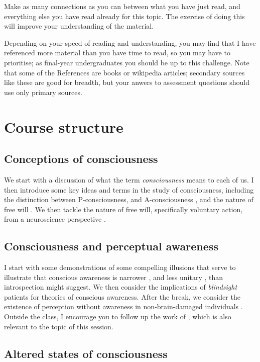 \documentclass[11pt]{article}
\begin{document}
Make as many connections as you can between what you have just read, and
everything else you have read already for this topic. The exercise of doing
this will improve your understanding of the material.

Depending on your speed of reading and understanding, you may find that I have
referenced more material than you have time to read, so you may have to
prioritise; as final-year undergraduates you should be up to this
challenge. Note that some of the References are books or wikipedia articles;
secondary sources like these are good for breadth, but your anwers to
assessment questions should use only primary sources.

\section*{Course structure}

\subsection*{Conceptions of consciousness}

We start with a discussion of what the term \emph{consciousness} means
to each of us. I then introduce some key ideas and terms in the study
of consciousness, including the distinction between P-consciousness,
and A-consciousness \cite{block95}, and the nature of free will
\cite{freewill}.  We then tackle the nature of free will, specifically
voluntary action, from a neuroscience perspective
\cite{lau04,libet83,haggard05}.

\subsection*{Consciousness and perceptual awareness}

I start with some demonstrations of some compelling illusions that
serve to illustrate that conscious awareness is narrower
\cite{simons05}, and less unitary \cite{aglioti95}, than introspection
might suggest. We then consider the implications of \emph{blindsight}
patients \cite{cowey04, azzopardi97, kentridge99} for theories of
conscious awareness. After the break, we consider the existence
\cite{williams, kolb95} of perception without awareness in
non-brain-damaged individuals \cite{merikle01}. Outside the class, I
encourage you to follow up the work of , which is
also relevant to the topic of this session.

\subsection*{Altered states of consciousness}
\end{document}
